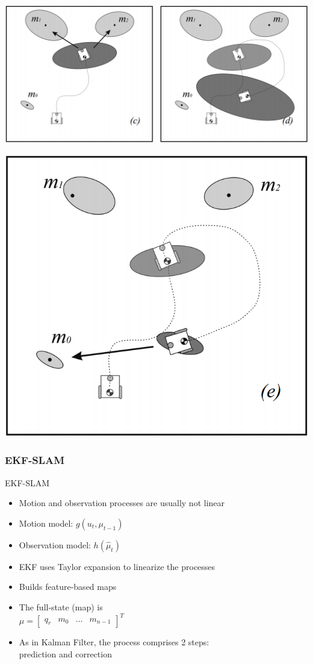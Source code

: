 \documentclass[serif]{beamer}
\begin{document}
    \begin{frame}
        \centering
        \includegraphics[width=\linewidth]{Images/fig26-slam-c-d.png}
    \end{frame}
    \begin{frame}
        \centering
        \includegraphics[width=0.5\linewidth]{Images/fig26-slam-e.png}
    \end{frame}

    \subsubsection{EKF-SLAM}
    \begin{frame}[nonumber]{EKF-SLAM}
         \begin{itemize}
             \item{Motion and observation processes are usually not linear}
             \item{Motion model: $g\left(u_t, \mu_{t-1}\right)$}
             \item{Observation model: $h\left(\hat\mu_t\right)$}
             \item{EKF uses Taylor expansion to linearize the processes}
             \item{Builds feature-based maps}
             \item{The full-state (map) is\\ $\mu = \begin{bmatrix} q_r & m_0 & \dots & m_{n-1}\end{bmatrix}^T$}
             \item{As in Kalman Filter, the process comprises 2 steps: \\prediction and correction}
         \end{itemize}
    \end{frame}
\end{document}
